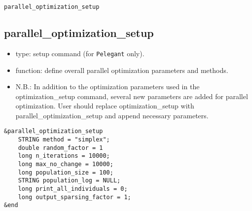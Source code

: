 \documentclass[11pt]{article}
\begin{document}
\begin{latexonly}
\newpage
\begin{center}{\Large\verb|parallel_optimization_setup|}\end{center}
\end{latexonly}
\subsection{parallel\_optimization\_setup \label{subsec:paralleloptimizationsetup}}

\begin{itemize}
\item type: setup command (for {\tt Pelegant} only).
\item function: define overall parallel optimization parameters and methods.
\item N.B.: In addition to the optimization parameters used in the optimization\_setup command, 	    
      several new parameters are added for parallel optimization. User should replace 
      optimization\_setup with parallel\_optimization\_setup and append necessary parameters. 
\end{itemize}

\begin{verbatim}
&parallel_optimization_setup
    STRING method = "simplex";
    double random_factor = 1
    long n_iterations = 10000;
    long max_no_change = 10000;
    long population_size = 100;
    STRING population_log = NULL;
    long print_all_individuals = 0;
    long output_sparsing_factor = 1;
&end
\end{verbatim}
\end{document}
